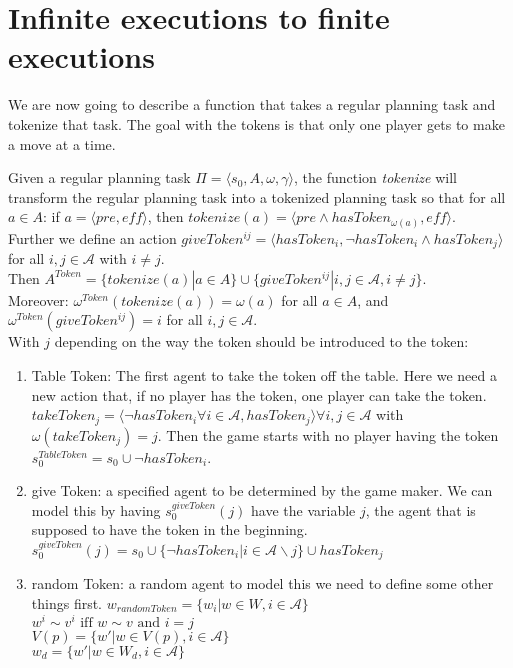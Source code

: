 \section{Infinite executions to finite executions}

We are now going to describe a function that takes a regular planning task and tokenize that task. The goal with the tokens is that only one player gets to make a move at a time.

Given a regular planning task $\Pi = \langle s_0, A, \omega, \gamma \rangle $, the function \textit{tokenize} will transform the regular planning task into a tokenized planning task so that for all $a \in A$:
 if $a = \langle pre, \textit{eff} \rangle$, then
   $tokenize(a) =\langle pre \wedge hasToken_{\omega(a)}, \textit{eff} \rangle$. \\
Further we define an action
    $ giveToken^{ij} = \langle hasToken_i, \neg hasToken_i \wedge hasToken_j \rangle $
    for all $i,j \in \mathcal{A}$ with $i \not = j$. \\
Then $ A^{Token}=\{tokenize(a)|a \in A\} \cup \{giveToken^{ij}|i,j \in \mathcal{A}, i \not = j\}$. \\
Moreover: $\omega^{Token}(tokenize(a))= \omega(a)$ for all $a \in A$,
and $\omega^{Token}(giveToken^{ij}) = i$ for all $i,j \in \mathcal{A}$. \\
With $j$ depending on the way the token should be introduced to the token:
\begin{enumerate}
  \item Table Token:
    The first agent to take the token off the table. Here we need a new action that, if no player has the token, one player can take the token.\\
    $takeToken_j=\langle \neg hasToken_i \forall i \in \mathcal{A}, hasToken_j \rangle \forall i,j \in \mathcal{A}$ with $\omega(takeToken_j)=j$. Then the game starts with no player having the token
    $s_0^{TableToken} = s_0 \cup \neg hasToken_i$.

  \item give Token:
    a specified agent to be determined by the game maker. We can model this by having $s_0^{giveToken}(j)$ have the variable $j$, the agent that is supposed to have the token in the beginning.
     $s_0^{giveToken}(j) = s_0 \cup \{\neg hasToken_i|i \in \mathcal{A} \backslash j\} \cup hasToken_j$
  \item random Token:
    a random agent
    to model this we need to define some other things first.
    $w_{randomToken}=\{w_i|w \in W, i\in \mathcal{A}\}$ \\
    $w^i \sim v^i \text{ iff } w \sim v \text{ and } i=j$ \\
    $V(p)=\{w'|w\in V(p), i\in \mathcal{A}\}$ \\
    $w_d=\{w'|w\in W_d, i\in \mathcal{A}\}$
\end{enumerate}



